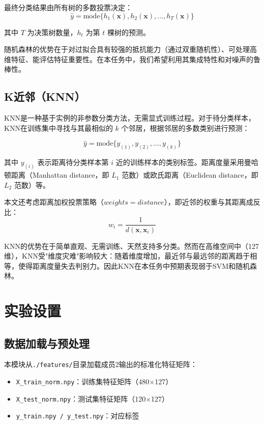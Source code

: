\documentclass[12pt,a4paper]{ctexart}
\begin{document}
最终分类结果由所有树的多数投票决定：
\begin{equation}
    \hat{y} = \text{mode}\{h_1(\mathbf{x}), h_2(\mathbf{x}), \ldots, h_T(\mathbf{x})\}
\end{equation}

其中 $T$ 为决策树数量，$h_t$ 为第 $t$ 棵树的预测。

随机森林的优势在于对过拟合具有较强的抵抗能力（通过双重随机性）、可处理高维特征、能评估特征重要性。在本任务中，我们希望利用其集成特性和对噪声的鲁棒性。

\subsection{K近邻（KNN）}

KNN是一种基于实例的非参数分类方法，无需显式训练过程。对于待分类样本，KNN在训练集中寻找与其最相似的 $k$ 个邻居，根据邻居的多数类别进行预测：

\begin{equation}
    \hat{y} = \text{mode}\{y_{(1)}, y_{(2)}, \ldots, y_{(k)}\}
\end{equation}

其中 $y_{(i)}$ 表示距离待分类样本第 $i$ 近的训练样本的类别标签。距离度量采用曼哈顿距离（Manhattan distance，即 $L_1$ 范数）或欧氏距离（Euclidean distance，即 $L_2$ 范数）等。

本文还考虑距离加权投票策略（$weights = distance$），即近邻的权重与其距离成反比：
\begin{equation}
    w_i = \frac{1}{d(\mathbf{x}, \mathbf{x}_i)}
\end{equation}

KNN的优势在于简单直观、无需训练、天然支持多分类。然而在高维空间中（127维），KNN受"维度灾难"影响较大：随着维度增加，最近邻与最远邻的距离趋于相等，使得距离度量失去判别力。因此KNN在本任务中预期表现弱于SVM和随机森林。

\section{实验设置}

\subsection{数据加载与预处理}

本模块从\texttt{./features/}目录加载成员2输出的标准化特征矩阵：
\begin{itemize}
    \item \texttt{X\_train\_norm.npy}：训练集特征矩阵（480$\times$127）
    \item \texttt{X\_test\_norm.npy}：测试集特征矩阵（120$\times$127）
    \item \texttt{y\_train.npy / y\_test.npy}：对应标签
\end{itemize}
\end{document}
